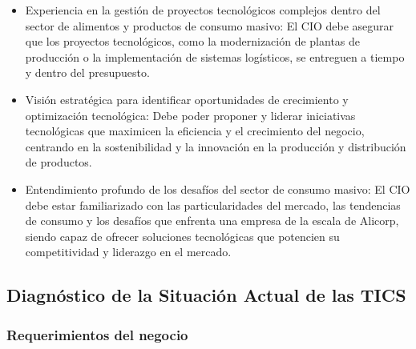 \begin{itemize}
        \item Experiencia en la gestión de proyectos tecnológicos complejos dentro del sector de alimentos y productos de consumo masivo: El CIO debe asegurar que los proyectos tecnológicos, como la modernización de plantas de producción o la implementación de sistemas logísticos, se entreguen a tiempo y dentro del presupuesto. 
        \item Visión estratégica para identificar oportunidades de crecimiento y optimización tecnológica: Debe poder proponer y liderar iniciativas tecnológicas que maximicen la eficiencia y el crecimiento del negocio, centrando en la sostenibilidad y la innovación en la producción y distribución de productos. 
        \item Entendimiento profundo de los desafíos del sector de consumo masivo: El CIO debe estar familiarizado con las particularidades del mercado, las tendencias de consumo y los desafíos que enfrenta una empresa de la escala de Alicorp, siendo capaz de ofrecer soluciones tecnológicas que potencien su competitividad y liderazgo en el mercado. 
    \end{itemize}


\subsection{Diagnóstico de la Situación Actual de las TICS}
\subsubsection{Requerimientos del negocio}
\lipsum[1]
